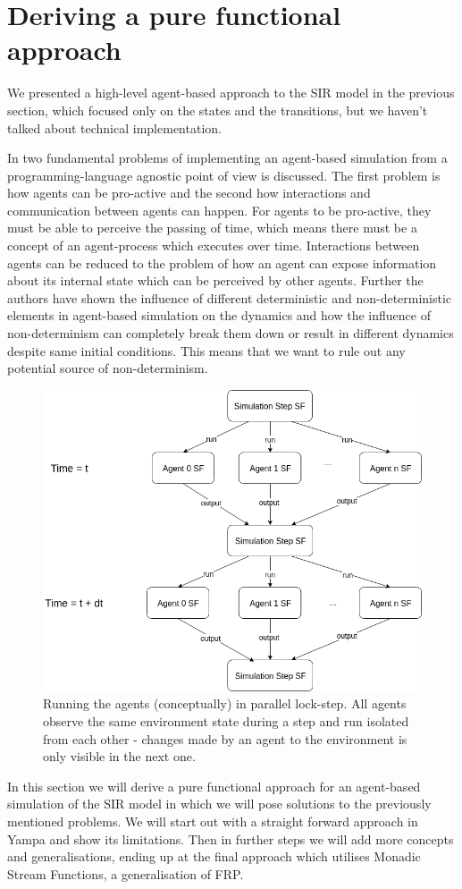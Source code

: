 \section{Deriving a pure functional approach}
\label{sec:functional_approach}

We presented a high-level agent-based approach to the SIR model in the previous section, which focused only on the states and the transitions, but we haven't talked about technical implementation. 

In \cite{thaler_art_2017} two fundamental problems of implementing an agent-based simulation from a programming-language agnostic point of view is discussed. The first problem is how agents can be pro-active and the second how interactions and communication between agents can happen. For agents to be pro-active, they must be able to perceive the passing of time, which means there must be a concept of an agent-process which executes over time. Interactions between agents can be reduced to the problem of how an agent can expose information about its internal state which can be perceived by other agents. Further the authors have shown the influence of different deterministic and non-deterministic elements in agent-based simulation on the dynamics and how the influence of non-determinism can completely break them down or result in different dynamics despite same initial conditions. This means that we want to rule out any potential source of non-determinism.

\begin{figure}
	\centering
	\includegraphics[width=.4\textwidth, angle=0]{./fig/diagrams/parallel_strategy.png}
	\caption{Running the agents (conceptually) in parallel lock-step. All agents observe the same environment state during a step and run isolated from each other - changes made by an agent to the environment is only visible in the next one.}
	\label{fig:parallel_strategy}
\end{figure}

In this section we will derive a pure functional approach for an agent-based simulation of the SIR model in which we will pose solutions to the previously mentioned problems. We will start out with a straight forward approach in Yampa and show its limitations. Then in further steps we will add more concepts and generalisations, ending up at the final approach which utilises Monadic Stream Functions, a generalisation of FRP.

